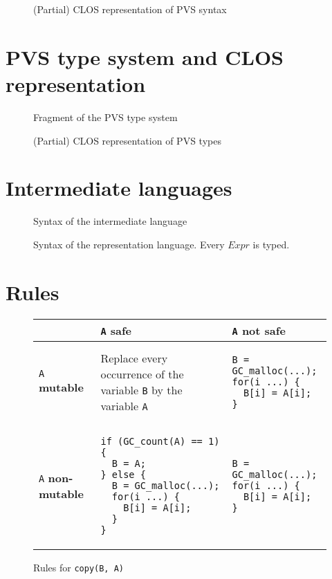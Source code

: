 \documentclass[12pt,a4paper]{article}
\newcommand{\cl}[1]{\texttt{#1}}
\newcommand{\mut}{  \textbf{ mutable } }
\newcommand{\nmut}{ \textbf{ non-mutable } }
\newcommand{\safe}{ \textbf{ safe } }
\begin{document}
\begin{figure}[!ht]

\caption{(Partial) CLOS representation of PVS syntax}
\label{fig:PVS-CLOS}
\end{figure}

\newpage
\section{PVS type system and CLOS representation}

\begin{figure}[!ht]

\caption{Fragment of the PVS type system}
\label{fig:PVS-types}
\end{figure}


\begin{figure}[!ht]

\caption{(Partial) CLOS representation of PVS types}
\label{fig:PVS-CLOS-types}
\end{figure}


\newpage
\section{Intermediate languages}

\begin{figure}[!ht]

\caption{Syntax of the intermediate language}
\label{fig:aux-syntax}
\end{figure}

\newpage
\begin{figure}[!ht]

\caption{Syntax of the representation language. Every $Expr$ is typed.}
\label{fig:Csyntax}
\end{figure}



\newpage
\section{Rules}
\label{Rules}


\begin{figure}[!ht]
\begin{tabular}{|p{5.5cm}|p{5.5cm}|p{6cm}|}
\hline
             & \cl{A} \safe & \cl{A} not \safe \\ \hline
\cl{A} \mut  & Replace every occurrence of the variable \cl{B} by the variable \cl{A} & \begin{lstlisting}
B = GC_malloc(...);
for(i ...) {
  B[i] = A[i];
}
\end{lstlisting} \\ \hline
\cl{A} \nmut & \begin{lstlisting}
if (GC_count(A) == 1) {
  B = A;
} else {
  B = GC_malloc(...);
  for(i ...) {
    B[i] = A[i];
  }
}
\end{lstlisting} & \begin{lstlisting}
B = GC_malloc(...);
for(i ...) {
  B[i] = A[i];
}
\end{lstlisting} \\ \hline
\end{tabular}
\caption{Rules for \cl{copy(B, A)}}
\end{figure}
\end{document}

